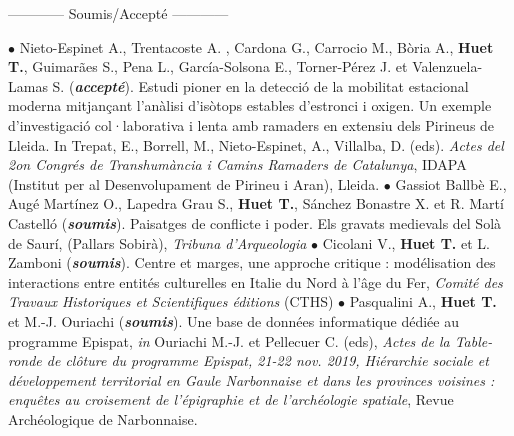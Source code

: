 \documentclass{article}
\newcommand{\fr}[1]{#1}       %
\newcommand{\en}[1]{}     %
\begin{document}
\smallbreak
\fr{\begin{center}------------ Soumis/Accepté ------------\end{center}}\en{{\begin{center}------------ Submitted/Accepted ------------\end{center}}}
\smallbreak
$\bullet$ Nieto-Espinet A., Trentacoste A. , Cardona G., Carrocio M.,  Bòria A., \textbf{Huet T.}, Guimarães S., Pena L., García-Solsona E., Torner-Pérez J. et  Valenzuela-Lamas S. (\textit{\textbf{accepté}}). Estudi pioner en la detecció de la mobilitat estacional moderna mitjançant l'anàlisi d'isòtops estables d'estronci i oxigen. Un exemple d'investigació col·laborativa i lenta amb ramaders en extensiu dels Pirineus de Lleida. In Trepat, E., Borrell, M., Nieto-Espinet, A., Villalba, D. (eds). \textit{Actes del 2on Congrés de Transhumància i Camins Ramaders de Catalunya}, IDAPA (Institut per al Desenvolupament de Pirineu i Aran), Lleida. 
\smallbreak
$\bullet$ Gassiot Ballbè E., Augé Martínez O., Lapedra Grau S., \textbf{Huet T.}, Sánchez Bonastre X. et R. Martí Castelló (\textit{\textbf{soumis}}). Paisatges de conflicte i poder. Els gravats medievals del Solà de Saurí, (Pallars Sobirà), \textit{Tribuna d'Arqueologia}
\smallbreak
$\bullet$ Cicolani V., \textbf{Huet T.} et L. Zamboni (\textit{\textbf{soumis}}). Centre et marges, une approche critique : modélisation des interactions entre entités culturelles en Italie du Nord à l'âge du Fer, \textit{Comit\'{e} des Travaux Historiques et Scientifiques \'{e}ditions} (CTHS)
\smallbreak
$\bullet$ Pasqualini A., \textbf{Huet T.} et M.-J. Ouriachi (\textit{\textbf{soumis}}). Une base de données informatique dédiée au programme Epispat, \textit{in} Ouriachi M.-J. et Pellecuer C. (eds), \textit{Actes de la Table-ronde de cl\^{o}ture du programme Epispat, 21-22 nov. 2019, Hi\'{e}rarchie sociale et d\'{e}veloppement territorial en Gaule Narbonnaise et dans les provinces voisines : enqu\^{e}tes au croisement de l'\'{e}pigraphie et de l'arch\'{e}ologie spatiale}, Revue Arch\'{e}ologique de Narbonnaise.
\smallbreak
\end{document}
